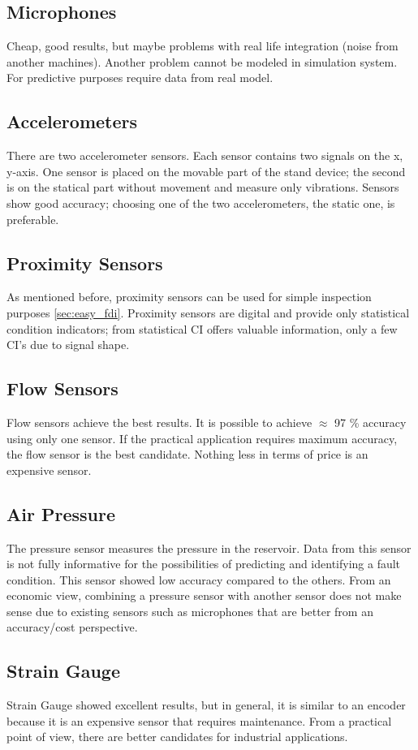 \subsection{Microphones}
Cheap, good results, but maybe problems with real life integration (noise
from another machines). Another problem cannot be modeled in simulation
system. For predictive purposes require data from real model.


\subsection{Accelerometers}
There are two accelerometer sensors. Each sensor contains two signals on
the x, y-axis.  One sensor is placed on the movable part of the stand
device; the second is on the statical part without movement and measure
only vibrations. Sensors show good accuracy; choosing one of the two
accelerometers, the static one, is preferable.

\subsection{Proximity Sensors}
As mentioned before, proximity sensors can be used for simple inspection
purposes \ref{sec:easy_fdi}. Proximity sensors are digital and provide only
statistical condition indicators; from statistical CI offers valuable
information, only a few CI's due to signal shape.

\subsection{Flow Sensors}
Flow sensors achieve the best results. It is possible to achieve $\approx$ 97
\% accuracy using only one sensor. If the practical application requires
maximum accuracy, the flow sensor is the best candidate. Nothing less in
terms of price is an expensive sensor.

\subsection{Air Pressure}
The pressure sensor measures the pressure in the reservoir. Data from this
sensor is not fully informative for the possibilities of predicting and
identifying a fault condition. This sensor showed low accuracy compared to
the others. From an economic view, combining a pressure sensor with another
sensor does not make sense due to existing sensors such as microphones that
are better from an accuracy/cost perspective.

\subsection{Strain Gauge}
Strain Gauge showed excellent results, but in general, it is similar to an
encoder because it is an expensive sensor that requires maintenance.  From
a practical point of view, there are better candidates for industrial
applications.
